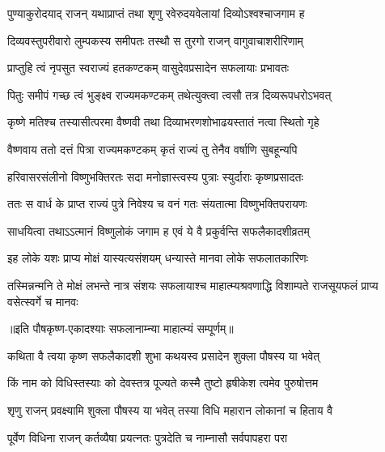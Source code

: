 \twolineshloka
{पुण्याकुरोदयाद् राजन् यथाप्राप्तं तथा शृणु}
{रवेरुदयवेलायां दिव्योऽश्वश्चाजगाम ह} %

\twolineshloka
{दिव्यवस्तुपरीवारो लुम्पकस्य समीपतः}
{तस्थौ स तुरगो राजन् वागुवाचाशरीरिणाम्} %

\twolineshloka
{प्राप्तुहि त्वं नृपसुत स्वराज्यं हतकण्टकम्}
{वासुदेवप्रसादेन सफलायाः प्रभावतः} %

\twolineshloka
{पितुः समीपं गच्छ त्वं भुङ्क्ष्व राज्यमकण्टकम्}
{तथेत्युक्त्वा त्वसौ तत्र दिव्यरूपधरोऽभवत्} %

\twolineshloka
{कृष्णे मतिश्च तस्यासीत्परमा वैष्णवी तथा}
{दिव्याभरणशोभाढयस्तातं नत्वा स्थितो गृहे} %

\twolineshloka
{वैष्णवाय ततो दत्तं पित्रा राज्यमकण्टकम्}
{कृतं राज्यं तु तेनैव वर्षाणि सुबहून्यपि} %

\twolineshloka
{हरिवासरसंलीनो विष्णुभक्तिरतः सदा}
{मनोज्ञास्त्वस्य पुत्राः स्युर्दाराः कृष्णप्रसादतः} %

\twolineshloka
{ततः स वार्ध के प्राप्त राज्यं पुत्रे निवेश्य च}
{वनं गतः संयतात्मा विष्णुभक्तिपरायणः} %

\twolineshloka
{साधयित्वा तथाऽऽत्मानं विष्णुलोकं जगाम ह}
{एवं ये वै प्रकुर्वन्ति सफलैकादशीव्रतम्} %

\twolineshloka
{इह लोके यशः प्राप्य मोक्षं यास्यत्यसंशयम्}
{धन्यास्ते मानवा लोके सफलातकारिणः} %


\threelineshloka
{तस्मिन्नन्मनि ते मोक्षं लभन्ते नात्र संशयः}
{सफलायाश्च माहात्म्यश्रवणाद्धि विशाम्पते}
{राजसूयफलं प्राप्य वसेत्स्वर्गे च मानवः} %

॥इति पौषकृष्ण-एकादश्याः सफलानाम्न्या माहात्म्यं सम्पूर्णम्॥


\hyperref[sec:ekadashi_mahatmyam_vrata_raja]{\closesub}
\clearpage

\label{sec:vrata-raja-pausha-shukla-putrada}


\twolineshloka
{कथिता वै त्वया कृष्ण सफलैकादशी शुभा}
{कथयस्व प्रसादेन शुक्ला पौषस्य या भवेत्} %

\twolineshloka
{किं नाम को विधिस्तस्याः को देवस्तत्र पूज्यते}
{कस्मै तुष्टो हृषीकेश त्वमेव पुरुषोत्तम} %


\twolineshloka
{शृणु राजन् प्रवक्ष्यामि शुक्ला पौषस्य या भवेत्}
{तस्या विधि महारान लोकानां च हिताय वै} %

\twolineshloka
{पूर्वेण विधिना राजन् कर्तव्यैषा प्रयत्नतः}
{पुत्रदेति च नाम्नासौ सर्वपापहरा परा} %

